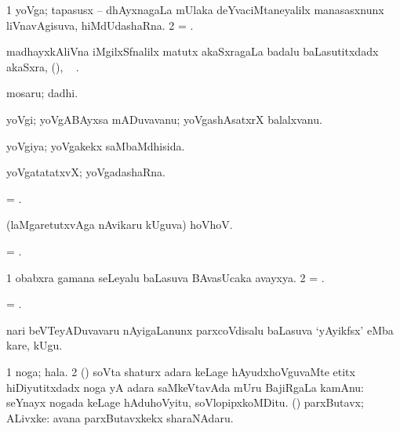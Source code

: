 \bentry
{} 
\gl{\nA} 
\bmng
\bnum
\num{1} yoVga; tapasusx -- dhAyxnagaLa mUlaka deYvaciMtaneyalilx manasasxnunx liVnavAgisuva, hiMdUdashaRna.   
\num{2} = .
\enum
\emng 
\eentry

\bentry
{} 
\gl{\nA} 
\bmng
madhayxkAliVna iMgilxSfnalilx   matutx  akaSxragaLa badalu baLasutitxdadx akaSxra, ({\yoghsymb{}}), \udA\  .
\emng
\eentry

\bentry
{} 
\gl{\nA} 
\bmng
mosaru; dadhi.
\emng
\eentry

\bentry
{} 
\gl{\nA} 
\bmng
yoVgi; yoVgABAyxsa mADuvavanu; yoVgashAsatxrX balalxvanu.
\emng
\eentry

\bentry
{} 
\gl{\gu} 
\bmng
yoVgiya; yoVgakekx saMbaMdhisida.
\emng
\eentry

\bentry
{} 
\gl{\nA}
\bmng
yoVgatatatxvX; yoVgadashaRna.
\emng
\eentry

\bentry
{} 
\gl{\nA} 
\bmng
= .
\emng
\eentry

\bentry
{} 
\gl{\BAavayx} 
\bmng
(laMgaretutxvAga nAvikaru kUguva) hoVhoV.
\emng
\eentry

\bentry
{} 
\gl{\nA} 
\bmng
= .
\emng
\eentry

\bentry
{} 
\gl{\BAavayx} 
\bmng
\bnum
\num{1} obabxra gamana seLeyalu baLasuva BAvasUcaka avayxya. 
\num{2} = .
\enum
\emng
\eentry

\bentry
{} 
\gl{\BAavayx} 
\bmng
= .
\emng
\eentry

\bentry
{} 
\gl{\BAavayx} 
\bmng
nari beVTeyADuvavaru nAyigaLanunx parxcoVdisalu baLasuva `yAyikfsx' eMba kare, kUgu.
\emng
\eentry

\bentry
{} 
\gl{\nA} 
\bmng
\bnum
\num{1} noga; hala. 
\num{2} (\roVca) soVta shaturx adara keLage hAyudxhoVguvaMte etitx hiDiyutitxdadx noga yA adara saMkeVtavAda mUru BajiRgaLa kamAnu:  seYnayx nogada keLage hAduhoVyitu, soVlopipxkoMDitu. 
 (\rUpa) 
\banum
{} parxButavx; ALivxke:  avana parxButavxkekx sharaNAdaru. 


